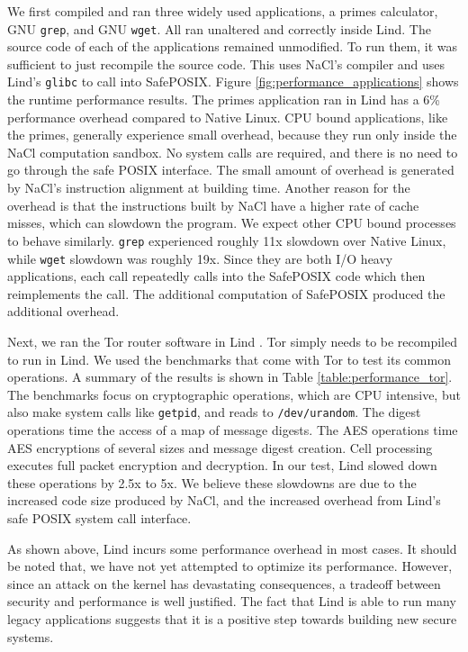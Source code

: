 We first compiled and ran three widely used applications, 
a primes calculator, GNU \texttt{grep}, and GNU \texttt{wget}. All ran unaltered and
correctly inside Lind. The source code of each of the applications remained
unmodified. To run them, it was sufficient to just recompile the source code.
This uses NaCl's compiler and uses Lind's \texttt{glibc} to call
into SafePOSIX.
Figure \ref{fig:performance_applications} shows the runtime performance
results. 
The primes application ran in Lind has a 6\% performance overhead compared to 
Native Linux. CPU bound applications, like the primes, generally experience small overhead, 
because they run only inside the NaCl computation sandbox. No system calls are required, 
and there is no need to go through the safe POSIX interface. The small amount of overhead 
is generated by NaCl's instruction alignment at building time. Another reason for the overhead 
is that the instructions built by NaCl have a higher rate of cache misses, which can slowdown the 
program. 
We expect other CPU bound processes to behave similarly. 
\texttt{grep} experienced roughly 11x slowdown over Native Linux, while \texttt{wget}
slowdown was roughly 19x. Since they are both I/O heavy applications, 
each call repeatedly calls into the SafePOSIX code which then reimplements
the call.  The additional computation of SafePOSIX produced the additional
overhead.  

Next, we ran the Tor router software in Lind . Tor simply
needs to be recompiled to run in Lind. 
We used the benchmarks that come with Tor to test its common operations. 
A summary of the results is shown in Table \ref{table:performance_tor}. The
benchmarks focus on cryptographic operations, 
which are CPU intensive, but also make system calls like \texttt{getpid}, and reads to
\texttt{/dev/urandom}.
The digest operations time the access of a map of message digests. 
The AES operations time AES encryptions of several sizes and message 
digest creation. 
Cell processing executes full packet encryption and decryption. In our
test, Lind slowed down these operations by 2.5x to 5x. We believe these
slowdowns are due to the increased code size produced by NaCl, 
and the
increased overhead from Lind's safe POSIX system call interface. 

As shown above,  Lind incurs some performance overhead in most cases. 
It should be noted that, we have not  yet attempted to optimize its performance. 
However, since an attack on the kernel has devastating
consequences, %
a tradeoff between security and performance is well justified. 
The fact that Lind is able to run many  legacy applications 
suggests that it
is a positive step towards building new secure systems. 

